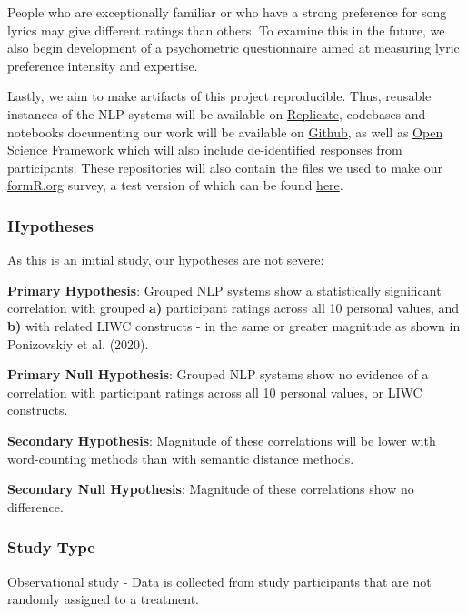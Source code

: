 \documentclass[
  letterpaper,
  DIV=11,
  numbers=noendperiod]{scrartcl}
\begin{document}
People who are exceptionally familiar or who have a strong preference
for song lyrics may give different ratings than others. To examine this
in the future, we also begin development of a psychometric questionnaire
aimed at measuring lyric preference intensity and expertise.

Lastly, we aim to make artifacts of this project reproducible. Thus,
reusable instances of the NLP systems will be available on
\href{https://replicate.com/eldrin/text-concept-similarity}{Replicate},
codebases and notebooks documenting our work will be available on
\href{https://https://github.com/andrew0302/values_from_lyrics}{Github},
as well as \href{https://osf.io/h87mz/}{Open Science Framework} which
will also include de-identified responses from participants. These
repositories will also contain the files we used to make our
\href{https://formR.org}{formR.org} survey, a test version of which can
be found \href{https://testmysurvey.formr.org/}{here}.

\hypertarget{sec-hypotheses}{%
\subsubsection{Hypotheses}\label{sec-hypotheses}}

As this is an initial study, our hypotheses are not severe:

\textbf{Primary Hypothesis}: Grouped NLP systems show a statistically
significant correlation with grouped \textbf{a)} participant ratings
across all 10 personal values, and \textbf{b)} with related LIWC
constructs - in the same or greater magnitude as shown in Ponizovskiy et
al. (2020).

\textbf{Primary Null Hypothesis}: Grouped NLP systems show no evidence
of a correlation with participant ratings across all 10 personal values,
or LIWC constructs.

\textbf{Secondary Hypothesis}: Magnitude of these correlations will be
lower with word-counting methods than with semantic distance methods.

\textbf{Secondary Null Hypothesis}: Magnitude of these correlations show
no difference.

\hypertarget{study-type}{%
\subsubsection{Study Type}\label{study-type}}

Observational study - Data is collected from study participants that are
not randomly assigned to a treatment.
\end{document}
